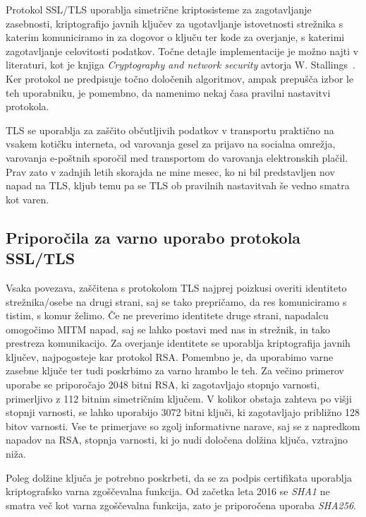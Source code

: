 \documentclass[12pt,a4paper,openany,tikz]{book}
\theoremstyle{plain}
\theoremstyle{definition}
\begin{document}
Protokol SSL/TLS uporablja simetrične kriptosisteme za zagotavljanje zasebnosti, kriptografijo javnih ključev za ugotavljanje istovetnosti strežnika s katerim komuniciramo in za dogovor o ključu ter kode za overjanje, s katerimi zagotavljanje celovitosti podatkov. Točne detajle implementacije je možno najti v literaturi, kot je knjiga \textit{Cryptography and network security} avtorja W. Stallings~\cite{stallings2006cryptography}. Ker protokol ne predpisuje točno določenih algoritmov, ampak prepušča izbor le teh uporabniku, je pomembno, da namenimo nekaj časa pravilni nastavitvi protokola.

\Gls{TLS} se uporablja za zaščito občutljivih podatkov v transportu praktično na vsakem kotičku interneta, od varovanja gesel za prijavo na socialna omrežja, varovanja e-poštnih sporočil med transportom do varovanja elektronskih plačil. Prav zato v zadnjih letih skorajda ne mine mesec, ko ni bil predstavljen nov napad na \gls{TLS}, kljub temu pa se \gls{TLS} ob pravilnih nastavitvah še vedno smatra kot varen.

\subsection{Priporočila za varno uporabo protokola SSL/TLS}
\label{sub:Priporočila za varno uporabo protokola SSL/TLS}

Vsaka povezava, zaščitena s protokolom TLS najprej poizkusi overiti identiteto strežnika/osebe na drugi strani, saj se tako prepričamo, da res komuniciramo s tistim, s komur želimo. Če ne preverimo identitete druge strani, napadalcu omogočimo MITM napad, saj se lahko postavi med nas in strežnik, in tako prestreza komunikacijo. Za overjanje identitete se uporablja kriptografija javnih ključev, najpogosteje kar protokol RSA. Pomembno je, da uporabimo varne zasebne ključe ter tudi poskrbimo za varno hrambo le teh. Za večino primerov uporabe se priporočajo 2048 bitni RSA, ki zagotavljajo stopnjo varnosti, primerljivo z 112 bitnim simetričnim ključem. V kolikor obstaja zahteva po višji stopnji varnosti, se lahko uporabijo 3072 bitni ključi, ki zagotavljajo približno 128 bitov varnosti. Vse te primerjave so zgolj informativne narave, saj se z napredkom napadov na RSA, stopnja varnosti, ki jo nudi določena dolžina ključa, vztrajno niža.

Poleg dolžine ključa je potrebno poskrbeti, da se za podpis certifikata uporablja kriptografsko varna zgoščevalna funkcija. Od začetka leta 2016 se \textit{SHA1} ne smatra več kot varna zgoščevalna funkcija, zato je priporočena uporaba \textit{SHA256}.
\end{document}

